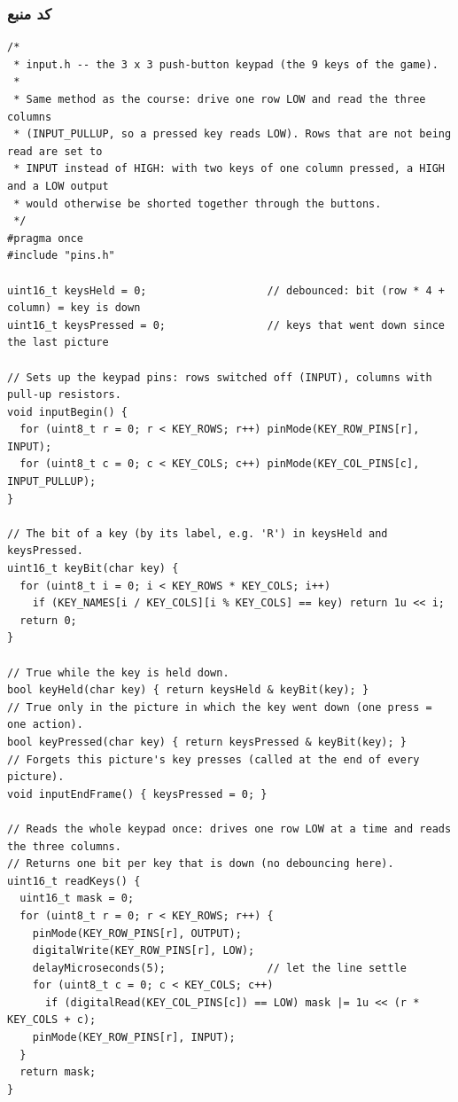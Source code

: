 \documentclass[11pt,a4paper]{article}
\begin{document}
\subsubsection*{کد منبع}
\begin{latin}
\begin{lstlisting}[language=Arduino]
/*
 * input.h -- the 3 x 3 push-button keypad (the 9 keys of the game).
 *
 * Same method as the course: drive one row LOW and read the three columns
 * (INPUT_PULLUP, so a pressed key reads LOW). Rows that are not being read are set to
 * INPUT instead of HIGH: with two keys of one column pressed, a HIGH and a LOW output
 * would otherwise be shorted together through the buttons.
 */
#pragma once
#include "pins.h"

uint16_t keysHeld = 0;                   // debounced: bit (row * 4 + column) = key is down
uint16_t keysPressed = 0;                // keys that went down since the last picture

// Sets up the keypad pins: rows switched off (INPUT), columns with pull-up resistors.
void inputBegin() {
  for (uint8_t r = 0; r < KEY_ROWS; r++) pinMode(KEY_ROW_PINS[r], INPUT);
  for (uint8_t c = 0; c < KEY_COLS; c++) pinMode(KEY_COL_PINS[c], INPUT_PULLUP);
}

// The bit of a key (by its label, e.g. 'R') in keysHeld and keysPressed.
uint16_t keyBit(char key) {
  for (uint8_t i = 0; i < KEY_ROWS * KEY_COLS; i++)
    if (KEY_NAMES[i / KEY_COLS][i % KEY_COLS] == key) return 1u << i;
  return 0;
}

// True while the key is held down.
bool keyHeld(char key) { return keysHeld & keyBit(key); }
// True only in the picture in which the key went down (one press = one action).
bool keyPressed(char key) { return keysPressed & keyBit(key); }
// Forgets this picture's key presses (called at the end of every picture).
void inputEndFrame() { keysPressed = 0; }

// Reads the whole keypad once: drives one row LOW at a time and reads the three columns.
// Returns one bit per key that is down (no debouncing here).
uint16_t readKeys() {
  uint16_t mask = 0;
  for (uint8_t r = 0; r < KEY_ROWS; r++) {
    pinMode(KEY_ROW_PINS[r], OUTPUT);
    digitalWrite(KEY_ROW_PINS[r], LOW);
    delayMicroseconds(5);                // let the line settle
    for (uint8_t c = 0; c < KEY_COLS; c++)
      if (digitalRead(KEY_COL_PINS[c]) == LOW) mask |= 1u << (r * KEY_COLS + c);
    pinMode(KEY_ROW_PINS[r], INPUT);
  }
  return mask;
}


\end{lstlisting}
\end{latin}
\end{document}
